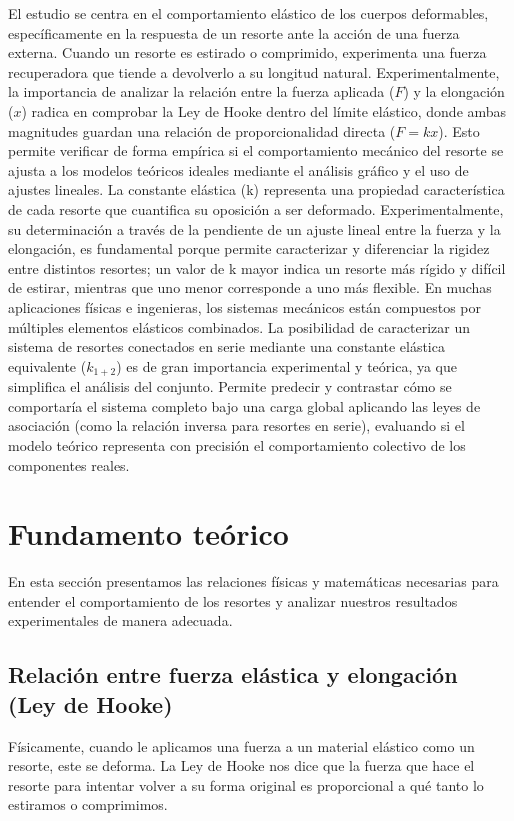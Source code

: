 \documentclass[12pt,a4paper]{article}
\begin{document}
El estudio se centra en el comportamiento elástico de los cuerpos deformables, específicamente en la respuesta de un resorte ante la acción de una fuerza externa. Cuando un resorte es estirado o comprimido, experimenta una fuerza recuperadora que tiende a devolverlo a su longitud natural. Experimentalmente, la importancia de analizar la relación entre la fuerza aplicada ($F$) y la elongación ($x$) radica en comprobar la Ley de Hooke dentro del límite elástico, donde ambas magnitudes guardan una relación de proporcionalidad directa ($F = kx$). Esto permite verificar de forma empírica si el comportamiento mecánico del resorte se ajusta a los modelos teóricos ideales mediante el análisis gráfico y el uso de ajustes lineales.
La constante elástica (k) representa una propiedad característica de cada resorte que cuantifica su oposición a ser deformado. Experimentalmente, su determinación a través de la pendiente de un ajuste lineal entre la fuerza y la elongación, es fundamental porque permite caracterizar y diferenciar la rigidez entre distintos resortes; un valor de k mayor indica un resorte más rígido y difícil de estirar, mientras que uno menor corresponde a uno más flexible.
En muchas aplicaciones físicas e ingenieras, los sistemas mecánicos están compuestos por múltiples elementos elásticos combinados. La posibilidad de caracterizar un sistema de resortes conectados en serie mediante una constante elástica equivalente ($k_{1+2}$) es de gran importancia experimental y teórica, ya que simplifica el análisis del conjunto. Permite predecir y contrastar cómo se comportaría el sistema completo bajo una carga global aplicando las leyes de asociación (como la relación inversa para resortes en serie), evaluando si el modelo teórico representa con precisión el comportamiento colectivo de los componentes reales.

\section{Fundamento teórico}

En esta sección presentamos las relaciones físicas y matemáticas necesarias para entender el comportamiento de los resortes y analizar nuestros resultados experimentales de manera adecuada.

\subsection{Relación entre fuerza elástica y elongación (Ley de Hooke)}
Físicamente, cuando le aplicamos una fuerza a un material elástico como un resorte, este se deforma. La Ley de Hooke nos dice que la fuerza que hace el resorte para intentar volver a su forma original es proporcional a qué tanto lo estiramos o comprimimos.
\end{document}
